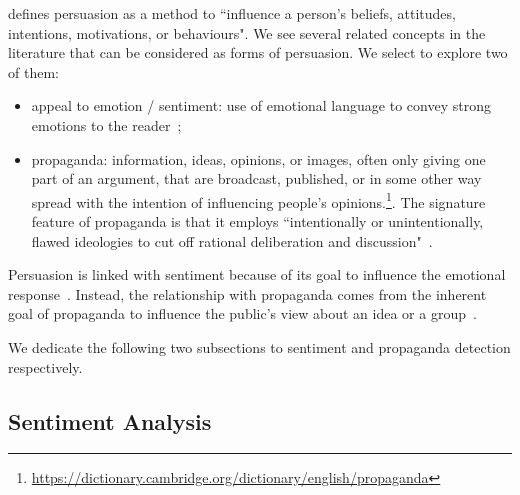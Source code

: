 \citet{gass2018persuasion} defines persuasion as a method to ``influence a person's beliefs, attitudes, intentions, motivations, or behaviours".
We see several related concepts in the literature that can be considered as forms of persuasion. We select to explore two of them:
\begin{itemize}
    \item appeal to emotion / sentiment: use of emotional language to convey strong emotions to the reader~\citep{ginosar2019patriotic}; %
    \item \gls{propaganda}:  information, ideas, opinions, or images, often only giving one part of an argument, that are broadcast, published, or in some other way spread with the intention of influencing people's opinions.\footnote{\url{https://dictionary.cambridge.org/dictionary/english/propaganda}}.
    The signature feature of propaganda is that it employs ``intentionally or unintentionally, flawed ideologies to cut off rational deliberation and discussion"~\citep{stanley2015propaganda}. %
\end{itemize}

Persuasion is linked with sentiment because of its goal to influence the emotional response~\citep{gatti2014sentiment,rocklage2018persuasion,petty2015emotion,desteno2004discrete}.
Instead, the relationship with propaganda comes from the inherent goal of propaganda to influence the public's view about an idea or a group~\citep{bernays,jowett2018propaganda}.

We dedicate the following two subsections to sentiment and propaganda detection respectively.

\subsection{\statusgreen Sentiment Analysis}
\label{sec:lit_sentiment}


